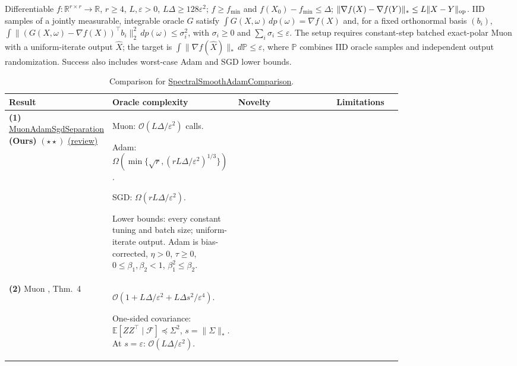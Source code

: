 \begin{table}[tp]
\centering
\caption{Comparison for \href{https://github.com/k3nfalt/longtails/blob/main/LongTails/Setups/SpectralSmoothAdamComparison.lean}{SpectralSmoothAdamComparison}.}\label{tab:SpectralSmoothAdamComparison}
\parbox{\linewidth}{\footnotesize Differentiable $f:\mathbb R^{r\times r}\to\mathbb R$, $r\ge4$, $L,\varepsilon>0$, $L\Delta\ge128\varepsilon^2$; $f\ge f_{\min}$ and $f(X_0)-f_{\min}\le\Delta$; $\|\nabla f(X)-\nabla f(Y)\|_*\le L\|X-Y\|_{\rm op}$. IID samples of a jointly measurable, integrable oracle $G$ satisfy $\int G(X,\omega)\,dp(\omega)=\nabla f(X)$ and, for a fixed orthonormal basis $(b_i)$, $\int\|(G(X,\omega)-\nabla f(X))^\top b_i\|_2^2\,dp(\omega)\le\sigma_i^2$, with $\sigma_i\ge0$ and $\sum_i\sigma_i\le\varepsilon$. The setup requires constant-step batched exact-polar Muon with a uniform-iterate output $\widehat X$; the target is $\int\|\nabla f(\widehat X)\|_*\,d\mathbb P\le\varepsilon$, where $\mathbb P$ combines IID oracle samples and independent output randomization. Success also includes worst-case Adam and SGD lower bounds.}\par\smallskip
\begin{threeparttable}
\footnotesize
\setlength{\tabcolsep}{4pt}\renewcommand{\arraystretch}{1.25}
\begin{tabularx}{\linewidth}{@{}>{\raggedright\arraybackslash}p{0.20\linewidth}>{\raggedright\arraybackslash}p{0.32\linewidth}>{\raggedright\arraybackslash}p{0.25\linewidth}>{\raggedright\arraybackslash}X@{}}
\toprule
\textbf{Result} & \textbf{Oracle complexity} & \textbf{Novelty} & \textbf{Limitations} \\
\midrule
\textbf{(1)} \href{https://github.com/k3nfalt/longtails/blob/main/LongTails/Theorems/MuonAdamSgdSeparation.lean}{Muon\allowbreak Adam\allowbreak Sgd\allowbreak Separation} \textbf{(Ours)} $(\star\star)$ \href{https://github.com/k3nfalt/longtails/blob/main/scripts/reviews/MuonAdamSgdSeparation.md}{(review)}
& Muon: $\mathcal O(L\Delta/\varepsilon^2)$ calls.\par Adam: $\Omega(\min\{\sqrt r,(rL\Delta/\varepsilon^2)^{1/3}\})$.\par SGD: $\Omega(rL\Delta/\varepsilon^2)$.\par Lower bounds: every constant tuning and batch size; uniform-iterate output. Adam is bias-corrected, $\eta>0$, $\tau\ge0$, $0\le\beta_1,\beta_2<1$, $\beta_1^2\le\beta_2$.
& & \\
\midrule[1.2pt]
\textbf{(2)} Muon \citep{bssTaoYuZhang2026v1}, Thm.~4
& $\mathcal O(1+L\Delta/\varepsilon^2+L\Delta s^2/\varepsilon^4)$.\par One-sided covariance: $\mathbb E[ZZ^\top\mid\mathcal F]\preceq\Sigma^2$, $s=\|\Sigma\|_*$. At $s=\varepsilon$: $\mathcal O(L\Delta/\varepsilon^2)$.

\end{tabularx}
\end{threeparttable}
\end{table}
